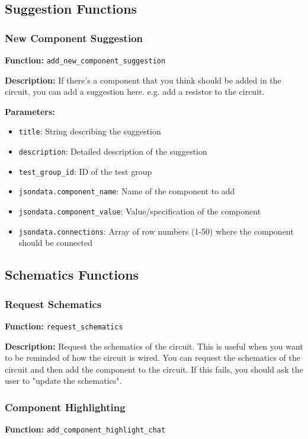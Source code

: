 \subsection{Suggestion Functions}

\subsubsection{New Component Suggestion}
\textbf{Function:} \texttt{add\_new\_component\_suggestion}

\textbf{Description:} If there's a component that you think should be added in the circuit, you can add a suggestion here. e.g. add a resistor to the circuit.

\textbf{Parameters:}
\begin{itemize}
    \item \texttt{title}: String describing the suggestion
    \item \texttt{description}: Detailed description of the suggestion
    \item \texttt{test\_group\_id}: ID of the test group
    \item \texttt{jsondata.component\_name}: Name of the component to add
    \item \texttt{jsondata.component\_value}: Value/specification of the component
    \item \texttt{jsondata.connections}: Array of row numbers (1-50) where the component should be connected
\end{itemize}

\subsection{Schematics Functions}

\subsubsection{Request Schematics}
\textbf{Function:} \texttt{request\_schematics}

\textbf{Description:} Request the schematics of the circuit. This is useful when you want to be reminded of how the circuit is wired. You can request the schematics of the circuit and then add the component to the circuit. If this fails, you should ask the user to "update the schematics".

\subsubsection{Component Highlighting}
\textbf{Function:} \texttt{add\_component\_highlight\_chat}

